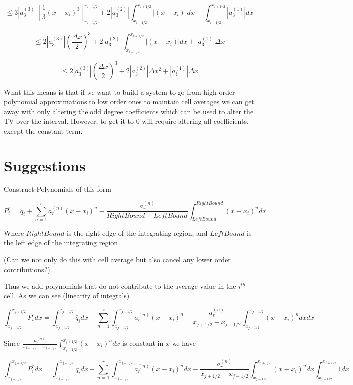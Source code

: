 \documentclass[10pt]{article}
\begin{document}
\[ \le 3 \left|a^{(3)}_3 \right| \left[\frac{1}{3}(x  - x_i)^3\right]_{x_{i-1/2}}^{x_{i+1/2}}  +  2\left| a^{(2)}_3\right| \int_{x_{i-1/2}}^{x_{i+1/2}}  \left|(x  - x_i)\right|dx  +  \int_{x_{i-1/2}}^{x_{i+1/2}} \left|a^{(1)}_3\right| dx\]


\[ \le 2 \left|a^{(3)}_3\right|\left(\frac{\Delta x}{2}\right)^3   +  2\left| a^{(2)}_3\right| \int_{x_{i-1/2}}^{x_{i+1/2}}  \left|(x  - x_i)\right|dx  +   \left|a^{(1)}_3\right| \Delta x \]

\[ \le 2 \left|a^{(3)}_3\right|\left(\frac{\Delta x}{2}\right)^3   +  2\left| a^{(2)}_3\right| \Delta x ^2 +   \left|a^{(1)}_3\right| \Delta x \]

What this means is that if we want to build a system to go from high-order polynomial approximations to low order ones to maintain cell averages we can get away with only altering the odd degree coefficients which can be used to alter the TV over the interval. However, to get it to $0$ will require altering all coefficients, except the constant term. 


\section{Suggestions}
Construct Polynomials of this form


\[P^r_i = \bar{q}_i + \sum_{n=1}^{r} a^{(n)}_r\left(x - x_i\right)^n - \frac{a^{(n)}_r}{RightBound - LeftBound}\int_{LeftBound}^{RightBound}(x  - x_i)^n dx \]

Where $RightBound$ is the right edge of the integrating region, and $LeftBound$ is the left edge of the integrating region

(Can we not only do this with cell average but also cancel any lower order contributions?)

Thus we add polynomials that do not contribute to the average value in the $i^{th}$ cell. As we can see (linearity of integrals)


\[ \int_{x_{j-1/2}}^{x_{j+1/2}} P^r_i dx =  \int_{x_{j-1/2}}^{x_{j+1/2}} \bar{q}_i dx + \sum_{n=1}^{r}  \int_{x_{j-1/2}}^{x_{j+1/2}} a^{(n)}_r\left(x - x_i\right)^n - \frac{a^{(n)}_r}{x_{j+1/2} - x_{j-1/2}}\int_{x_{j-1/2}}^{x_{j+1/2}}(x  - x_i)^n dx dx \]

Since $\frac{a^{(n)}_r}{x_{j+1/2} - x_{j-1/2}}\int_{x_{j-1/2}}^{x_{j+1/2}}(x  - x_i)^n dx$ is constant in $x$ we have


\[ \int_{x_{j-1/2}}^{x_{j+1/2}} P^r_i dx =  \int_{x_{j-1/2}}^{x_{j+1/2}} \bar{q}_i dx + \sum_{n=1}^{r}  \int_{x_{j-1/2}}^{x_{j+1/2}} a^{(n)}_r\left(x - x_i\right)^n dx  - \frac{a^{(n)}_r}{x_{j+1/2} - x_{j-1/2}}\int_{x_{j-1/2}}^{x_{j+1/2}}(x  - x_i)^n dx \int_{x_{j-1/2}}^{x_{j+1/2}} 1 dx  \] 
\end{document}
